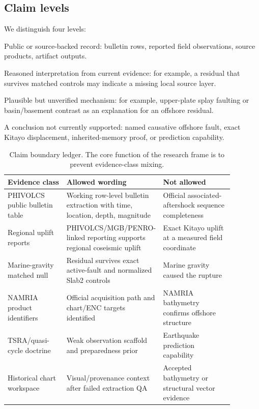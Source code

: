 \documentclass[11pt]{article}
\begin{document}
\subsection{Claim levels}

We distinguish four levels:
\begin{description}[leftmargin=2.6cm,style=nextline]
  \item[Observation] Public or source-backed record: bulletin rows, reported field observations, source products, artifact outputs.
  \item[Inference] Reasoned interpretation from current evidence: for example, a residual that survives matched controls may indicate a missing local source layer.
  \item[Hypothesis] Plausible but unverified mechanism: for example, upper-plate splay faulting or basin/basement contrast as an explanation for an offshore residual.
  \item[Blocked claim] A conclusion not currently supported: named causative offshore fault, exact Kitayo displacement, inherited-memory proof, or prediction capability.
\end{description}

\begin{table}[H]
\centering
\caption{Claim boundary ledger. The core function of the research frame is to prevent evidence-class mixing.}
\label{tab:claim-ledger}
\begin{tabular}{p{0.26\linewidth}p{0.31\linewidth}p{0.31\linewidth}}
\toprule
\textbf{Evidence class} & \textbf{Allowed wording} & \textbf{Not allowed} \\
\midrule
PHIVOLCS public bulletin table & Working row-level bulletin extraction with time, location, depth, magnitude & Official associated-aftershock sequence completeness \\
Regional uplift reports & PHIVOLCS/MGB/PENRO-linked reporting supports regional coseismic uplift & Exact Kitayo uplift at a measured field coordinate \\
Marine-gravity matched null & Residual survives exact active-fault and normalized Slab2 controls & Marine gravity caused the rupture \\
NAMRIA product identifiers & Official acquisition path and chart/ENC targets identified & NAMRIA bathymetry confirms offshore structure \\
TSRA/quasi-cycle doctrine & Weak observation scaffold and preparedness prior & Earthquake prediction capability \\
Historical chart workspace & Visual/provenance context after failed extraction QA & Accepted bathymetry or structural vector evidence \\
\bottomrule
\end{tabular}
\end{table}
\end{document}
